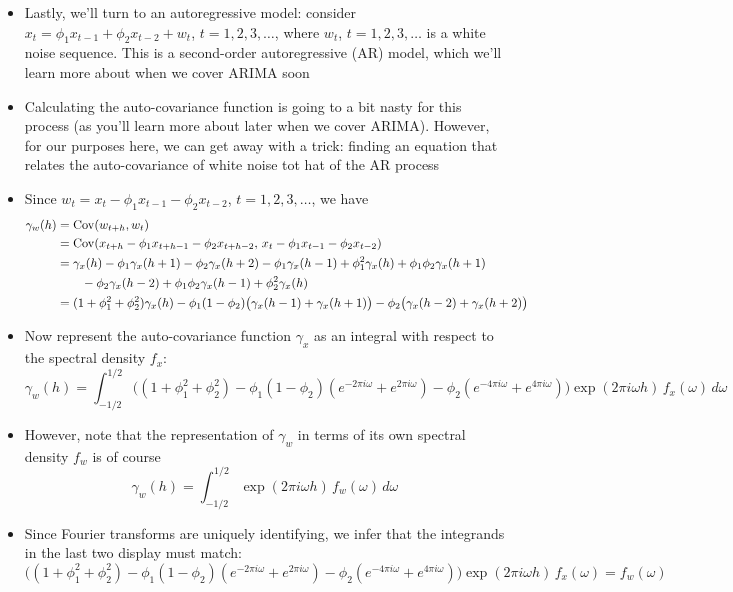 \documentclass{article}
\begin{document}
\begin{itemize}
\item Lastly, we'll turn to an autoregressive model: consider $x_t = \phi_1
  x_{t-1} + \phi_2 x_{t-2} + w_t$, $t = 1,2,3,\dots$, where $w_t$, $t = 
  1,2,3,\dots$ is a white noise sequence. This is a second-order autoregressive
  (AR) model, which we'll learn more about when we cover ARIMA soon

\item Calculating the auto-covariance function is going to a bit nasty for this 
  process (as you'll learn more about later when we cover ARIMA). However, for
  our purposes here, we can get away with a trick: finding an equation that
  relates the auto-covariance of white noise tot hat of the AR process 

\item Since $w_t = x_t - \phi_1 x_{t-1} - \phi_2 x_{t-2}$, $t = 1,2,3,\dots$, we
  have 
  \begin{align*}
  \gamma_w(h) &= \operatorname{Cov}(w_{t+h}, w_t) \\
  &= \operatorname{Cov}(x_{t+h} - \phi_1 x_{t+h-1} -  \phi_2 x_{t+h-2}, \,
    x_t - \phi_1 x_{t-1} - \phi_2 x_{t-2}) \\
  &= \gamma_x(h) - \phi_1 \gamma_x(h+1) - \phi_2 \gamma_x(h+2) 
    - \phi_1 \gamma_x(h-1) + \phi_1^2 \gamma_x(h) + \phi_1 \phi_2 
    \gamma_x(h+1) \\ 
    &\qquad - \phi_2 \gamma_x(h-2) +  \phi_1 \phi_2 \gamma_x(h-1) + \phi_2^2
    \gamma_x(h) \\
    &= (1+\phi_1^2+\phi_2^2) \gamma_x(h)  
      -\phi_1(1-\phi_2) \big( \gamma_x(h-1) + \gamma_x(h+1) \big) 
      - \phi_2 \big( \gamma_x(h-2) + \gamma_x(h+2) \big)  
  \end{align*}

\item Now represent the auto-covariance function $\gamma_x$ as an integral with
  respect to the spectral density $f_x$:
  \[
  \gamma_w(h) = \int_{-1/2}^{1/2} \Big( (1+\phi_1^2+\phi_2^2)  
  - \phi_1(1-\phi_2) (e^{-2\pi i \omega} + e^{2\pi i \omega})
  - \phi_2 (e^{-4\pi i \omega} + e^{4\pi i \omega}) \Big) \exp(2\pi i \omega
  h) \, f_x(\omega) \, d\omega
  \]

\item However, note that the representation of $\gamma_w$ in terms of its own
  spectral density $f_w$ is of course
  \[
  \gamma_w(h) = \int_{-1/2}^{1/2} \exp(2\pi i \omega h) \, f_w(\omega) \,
  d\omega 
  \]

\item Since Fourier transforms are uniquely identifying, we infer that the
  integrands in the last two display must match:
  \[
  \Big( (1+\phi_1^2+\phi_2^2)  
    - \phi_1(1-\phi_2) (e^{-2\pi i \omega} + e^{2\pi i \omega})
    - \phi_2 (e^{-4\pi i \omega} + e^{4\pi i \omega}) \Big) \exp(2\pi i \omega
    h) \, f_x(\omega) = f_w(\omega)
  \]


\end{itemize}
\end{document}
